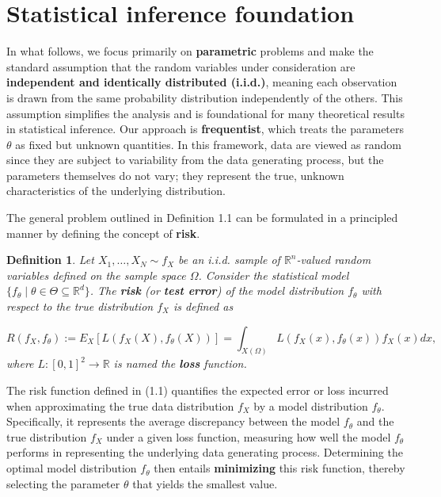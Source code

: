 \documentclass{report}
\newtheorem{definition}{Definition}[chapter]
\begin{document}
\section{Statistical inference foundation}
In what follows, we focus primarily on \textbf{parametric} problems and make the standard assumption that the random variables under consideration are \textbf{independent and identically distributed (i.i.d.)}, meaning each observation is drawn from the same probability distribution independently of the others. This assumption simplifies the analysis and is foundational for many theoretical results in statistical inference. Our approach is \textbf{frequentist}, which treats the parameters $\theta$ as fixed but unknown quantities. In this framework, data are viewed as random since they are subject to variability from the data generating process, but the parameters themselves do not vary; they represent the true, unknown characteristics of the underlying distribution.

The general problem outlined in Definition 1.1 can be formulated in a principled manner by defining the concept of \textbf{risk}.

\begin{definition}
Let $X_1,\dots,X_N \sim f_X$ be an i.i.d. sample of $\mathbb{R}^n$-valued random variables defined on the sample space $\Omega$. Consider the statistical model $\{f_\theta \mid\theta\in\Theta\subseteq\mathbb{R}^d\}$. The \textbf{risk} (or \textbf{test error}) of the model distribution $f_\theta$ with respect to the true distribution $f_X$ is defined as

\begin{equation}
R(f_X,f_\theta) := E_X[L(f_X(X),f_\theta(X))] = \int_{X(\Omega)} L(f_X(x),f_\theta(x))f_X(x)dx,
\end{equation}
where $L : [0,1]^2 \to \mathbb{R}$ is named the \textbf{loss} function.
\end{definition}
The risk function defined in (1.1) quantifies the expected error or loss incurred when approximating the true data distribution $f_X$ by a model distribution $f_\theta$. Specifically, it represents the average discrepancy between the model $f_\theta$ and the true distribution $f_X$ under a given loss function, measuring how well the model $f_\theta$ performs in representing the underlying data generating process. Determining the optimal model distribution $f_\theta$ then entails \textbf{minimizing} this risk function, thereby selecting the parameter $\theta$ that yields the smallest value.
\end{document}
